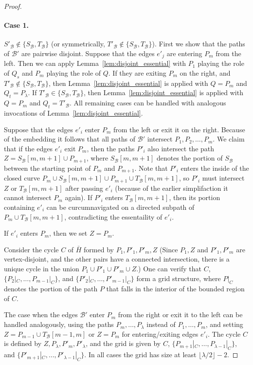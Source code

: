 \documentclass[a4paper,11pt]{article}
\newcommand{\calB}{\mathcal{B}}
\theoremstyle{plain}
\newtheorem{identification rule}{Identification Rule}
\theoremstyle{definition}
\theoremstyle{remark}
\begin{document}
\begin{proof}
\paragraph*{Case 1.} $S'_\calB\not\in \{S_\calB,T_\calB\}$ (or symmetrically, $T'_\calB\not\in \{S_\calB,T_\calB\}$).
First we show that the paths of $\calB'$ are pairwise disjoint. Suppose that the edges $e'_j$ are entering $P_m$ from the left. Then we can apply Lemma~\ref{lem:disjoint_essential} with $P_1$ playing the role of $Q_s$ and $P_m$ playing the role of $Q$.  If they are exiting $P_m$ on the right, and $T'_\calB \not\in \{S_\calB,T_\calB\}$, then Lemma~\ref{lem:disjoint_essential} is applied with $Q=P_m$ and $Q_t=P_\lambda$. If $T'_\calB \in \{S_\calB,T_\calB\}$, then Lemma~\ref{lem:disjoint_essential} is applied with $Q=P_m$ and $Q_t=T'_\calB$. All remaining cases can be handled with analogous invocations of Lemma~\ref{lem:disjoint_essential}.

Suppose that the edges $e'_i$ enter $P_m$ from the left or exit it on the right. Because of the embedding it follows that all paths of $\calB'$ intersect $P_1,P_2,\dots,P_m$. We claim that if the edges $e'_i$ exit $P_m$, then the paths $P'_i$ also intersect the path $Z=S_\calB[m,m+1]\cup P_{m+1}$, where $S_\calB[m,m+1]$ denotes the portion of $S_\calB$ between the starting point of $P_m$ and $P_{m+1}$. Note that $P'_i$ enters the inside of the closed curve $P_{m} \cup S_\calB[m,m+1] \cup P_{m+1} \cup T_\calB[m,m+1]$, so $P'_i$ must intersect $Z$ or $T_\calB[m,m+1]$ after passing $e'_i$ (because of the earlier simplifaction it cannot intersect $P_m$ again). If $P'_i$ enters $T_\calB[m,m+1]$, then its portion containing $e'_i$ can be curcumnavigated on a directed subpath of $P_m\cup T_\calB[m,m+1]$, contradicting the essentaility of $e'_i$.

If $e'_i$ enters $P_m$, then we set $Z=P_m$.

Consider the cycle $C$ of $\bar H$ formed by $P_1,P'_1,P'_m,Z$ (Since $P_1,Z$ and $P'_1,P'_m$ are vertex-disjoint, and the other pairs have a connected intersection, there is a unique cycle in the union $P_1 \cup P'_1 \cup P'_m \cup Z$.) One can verify that $C$, $\{P_2|_C,\dots,P_{m-1}|_C\}$, and $\{P'_2|_C,\dots,P'_{m-1}|_C\}$ form a grid structure, where $P|_C$ denotes the portion of the path $P$ that falls in the interior of the bounded region of $C$.

The case when the edges $\calB'$  enter $P_m$ from the right or exit it to the left can be handled analogously, using the paths $P_m,\dots,P_\lambda$ instead of $P_1,\dots, P_m$, and setting $Z=P_{m-1}\cup T_\calB[m-1,m]$ or $Z=P_m$ for entering/exiting edges $e'_i$. The cycle $C$ is defined by $Z,P_\lambda,P'_m,P'_\lambda$, and the grid is given by $C$, $\{P_{m+1}|_C,\dots,P_{\lambda-1}|_C\}$, and $\{P'_{m+1}|_C,\dots,P'_{\lambda-1}|_C\}$. In all cases the grid has size at least $\lfloor \lambda/2 \rfloor -2$.


\end{proof}
\end{document}
